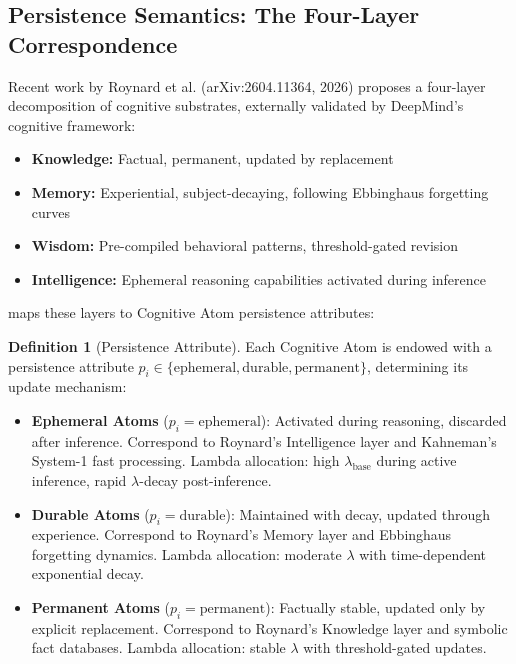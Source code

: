 \documentclass[11pt,a4paper]{article}
\theoremstyle{definition}
\newtheorem{definition}{Definition}[section]
\theoremstyle{remark}
\newcommand{\CAA}{\text{CAA-X}}
\begin{document}
\subsection{Persistence Semantics: The Four-Layer Correspondence}\label{subsec:persistence}

Recent work by Roynard et al. (arXiv:2604.11364, 2026) proposes a four-layer decomposition of cognitive substrates, externally validated by DeepMind's cognitive framework:
\begin{itemize}
    \item \textbf{Knowledge:} Factual, permanent, updated by replacement
    \item \textbf{Memory:} Experiential, subject-decaying, following Ebbinghaus forgetting curves
    \item \textbf{Wisdom:} Pre-compiled behavioral patterns, threshold-gated revision
    \item \textbf{Intelligence:} Ephemeral reasoning capabilities activated during inference
\end{itemize}

\CAA{} maps these layers to Cognitive Atom persistence attributes:

\begin{definition}[Persistence Attribute]\label{def:persistence}
Each Cognitive Atom is endowed with a persistence attribute $p_i \in \{\text{ephemeral}, \text{durable}, \text{permanent}\}$, determining its update mechanism:
\begin{itemize}
    \item \textbf{Ephemeral Atoms} ($p_i = \text{ephemeral}$): Activated during reasoning, discarded after inference. Correspond to Roynard's Intelligence layer and Kahneman's System-1 fast processing. Lambda allocation: high $\lambda_{\text{base}}$ during active inference, rapid $\lambda$-decay post-inference.
    \item \textbf{Durable Atoms} ($p_i = \text{durable}$): Maintained with decay, updated through experience. Correspond to Roynard's Memory layer and Ebbinghaus forgetting dynamics. Lambda allocation: moderate $\lambda$ with time-dependent exponential decay.
    \item \textbf{Permanent Atoms} ($p_i = \text{permanent}$): Factually stable, updated only by explicit replacement. Correspond to Roynard's Knowledge layer and symbolic fact databases. Lambda allocation: stable $\lambda$ with threshold-gated updates.
\end{itemize}
\end{definition}
\end{document}
